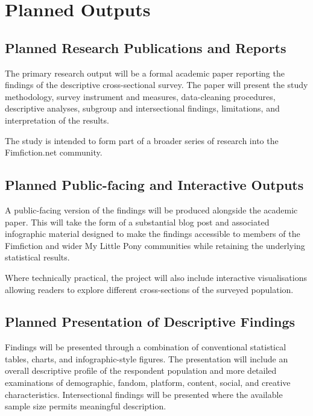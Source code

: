 \section{Planned Outputs}

\subsection{Planned Research Publications and Reports}

The primary research output will be a formal academic paper reporting the findings of the descriptive cross-sectional survey. The paper will present the study methodology, survey instrument and measures, data-cleaning procedures, descriptive analyses, subgroup and intersectional findings, limitations, and interpretation of the results.

The study is intended to form part of a broader series of research into the Fimfiction.net community.


\subsection{Planned Public-facing and Interactive Outputs}

A public-facing version of the findings will be produced alongside the academic paper. This will take the form of a substantial blog post and associated infographic material designed to make the findings accessible to members of the Fimfiction and wider My Little Pony communities while retaining the underlying statistical results.

Where technically practical, the project will also include interactive visualisations allowing readers to explore different cross-sections of the surveyed population.


\subsection{Planned Presentation of Descriptive Findings}


Findings will be presented through a combination of conventional statistical tables, charts, and infographic-style figures. The presentation will include an overall descriptive profile of the respondent population and more detailed examinations of demographic, fandom, platform, content, social, and creative characteristics. Intersectional findings will be presented where the available sample size permits meaningful description.

